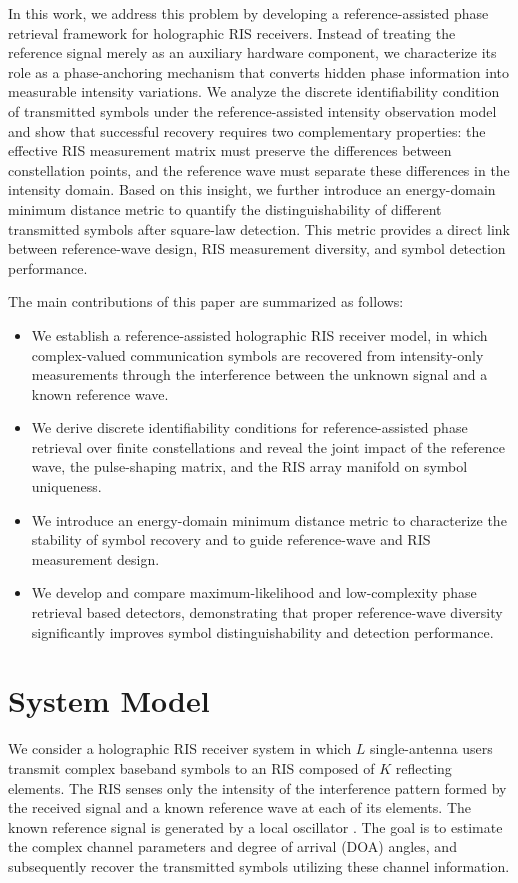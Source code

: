 \documentclass[journal]{IEEEtran}
\begin{document}
In this work, we address this problem by developing a reference-assisted phase retrieval framework for holographic RIS receivers. Instead of treating the reference signal merely as an auxiliary hardware component, we characterize its role as a phase-anchoring mechanism that converts hidden phase information into measurable intensity variations. We analyze the discrete identifiability condition of transmitted symbols under the reference-assisted intensity observation model and show that successful recovery requires two complementary properties: the effective RIS measurement matrix must preserve the differences between constellation points, and the reference wave must separate these differences in the intensity domain. Based on this insight, we further introduce an energy-domain minimum distance metric to quantify the distinguishability of different transmitted symbols after square-law detection. This metric provides a direct link between reference-wave design, RIS measurement diversity, and symbol detection performance.

The main contributions of this paper are summarized as follows:
\begin{itemize}
\item We establish a reference-assisted holographic RIS receiver model, in which complex-valued communication symbols are recovered from intensity-only measurements through the interference between the unknown signal and a known reference wave.
\item We derive discrete identifiability conditions for reference-assisted phase retrieval over finite constellations and reveal the joint impact of the reference wave, the pulse-shaping matrix, and the RIS array manifold on symbol uniqueness.
\item We introduce an energy-domain minimum distance metric to characterize the stability of symbol recovery and to guide reference-wave and RIS measurement design.
\item We develop and compare maximum-likelihood and low-complexity phase retrieval based detectors, demonstrating that proper reference-wave diversity significantly improves symbol distinguishability and detection performance.
\end{itemize}


\section{System Model}
\label{sec:system_model}

We consider a holographic RIS receiver system in which $L$ single-antenna users transmit complex baseband symbols to an RIS composed of $K$ reflecting elements. The RIS senses only the intensity of the interference pattern formed by the received signal and a known reference wave at each of its elements. The known reference signal is generated by a local oscillator \cite{huangjd2024CS}. The goal is to estimate the complex channel parameters and degree of arrival (DOA) angles, and subsequently recover the transmitted symbols utilizing these channel information. 
\end{document}
